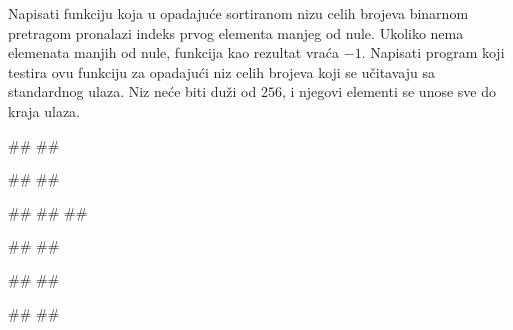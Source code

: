 \begin{Exercise}[label=3_09]
Napisati funkciju koja u opadajuće sortiranom nizu celih brojeva
binarnom pretragom pronalazi indeks prvog elementa manjeg od
nule. Ukoliko nema elemenata manjih od nule, funkcija kao rezultat
vraća $-1$. Napisati program koji testira ovu funkciju za
opadajući niz celih brojeva koji se učitavaju sa standardnog ulaza. Niz
neće biti duži od $256$, i njegovi elementi se unose sve do kraja
ulaza.

\begin{minitest}
\begin{test}{1}
#\naslovUlaz#
##

#\naslovIzlaz#
##
\end{test}
\end{minitest}
\begin{minitest}
\begin{test}{2}
#\naslovUlaz#
##
##

#\naslovIzlaz#
##
\end{test}
\end{minitest}
\begin{minitest}
\begin{test}{3}
#\naslovUlaz#
##

#\naslovIzlaz#
##
\end{test}
\end{minitest}


\end{Exercise}

